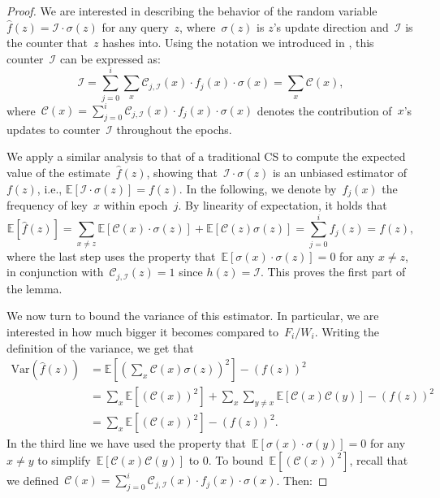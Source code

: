 \documentclass[sigconf]{acmart}
\newcommand{\parentheses}[1]{\left(#1\right)}
\newcommand{\expectation}[1]{\mathbb{E}\left[ #1 \right]}
\newcommand{\variance}[1]{\mathrm{Var}\left( #1 \right)}
\begin{document}
\begin{proof}
    We are interested in describing the behavior of the random
    variable~$\hat{f}(z) = \mathcal{I} \cdot \sigma(z)$ for any query~$z$,
    where~$\sigma(z)$ is $z$'s update direction and~$\mathcal{I}$ is the
    counter that~$z$ hashes into. Using the notation we introduced in
    , this counter~$\mathcal{I}$ can be expressed
    as:
    $$ \mathcal{I} = \sum_{j=0}^i \sum_x \mathcal{C}_{j,\mathcal{I}}(x) \cdot f_j(x) \cdot \sigma(x) = \sum_x \mathcal{C}(x), $$
    where~$\mathcal{C}(x) = \sum_{j=0}^i \mathcal{C}_{j,\mathcal{I}}(x) \cdot
    f_j(x) \cdot \sigma(x)$ denotes the contribution of~$x$'s updates to
    counter~$\mathcal{I}$ throughout the epochs.

    We apply a similar analysis to that of a traditional CS to compute the
    expected value of the estimate~$\hat{f}(z)$, showing that~$\mathcal{I}
    \cdot \sigma(z)$ is an unbiased estimator of~$f(z)$, i.e.,
    $\expectation{\mathcal{I} \cdot \sigma(z)} = f(z)$. In the following, we
    denote by~$f_j(x)$ the frequency of key~$x$ within epoch~$j$. By linearity
    of expectation, it holds that
    $$ \expectation{\hat{f}(z)} = \sum_{x \neq z} \expectation{\mathcal{C}(x) \cdot \sigma(z) } + \expectation{\mathcal{C}(z)\sigma(z)} = \sum_{j=0}^i f_j(z) = f(z),$$
    where the last step uses the property that~$\expectation{\sigma(x) \cdot
    \sigma(z) } = 0$ for any $x \neq z$, in conjunction
    with~$\mathcal{C}_{j,\mathcal{I}}(z)=1$ since $h(z)=\mathcal{I}$. This
    proves the first part of the lemma.

    We now turn to bound the variance of this estimator. In particular, we are
    interested in how much bigger it becomes compared to~$F_i/W_i$. Writing the
    definition of the variance, we get that
    \begin{align*}
        \variance{\hat{f}(z)} &= \expectation{\parentheses{\sum_x \mathcal{C}(x) \sigma(z)}^2} - (f(z))^2 \\
        & = \sum_x \expectation{\parentheses{\mathcal{C}(x)}^2} + \sum_x \sum_{y \neq x}\expectation{ \mathcal{C}(x) \mathcal{C}(y)} - (f(z))^2 \\
        & = \sum_x \expectation{\parentheses{\mathcal{C}(x)}^2} - (f(z))^2.
    \end{align*}
    In the third line we have used the property that~$\expectation{\sigma(x)
    \cdot \sigma(y)}=0$ for any $x\neq y$ to
    simplify~$\expectation{\mathcal{C}(x) \mathcal{C}(y)}$ to 0. To
    bound~$\expectation{\parentheses{\mathcal{C}(x)}^2}$, recall that we
    defined~$\mathcal{C}(x) = \sum_{j=0}^i \mathcal{C}_{j,\mathcal{I}}(x) \cdot
    f_j(x) \cdot \sigma(x)$. Then:


\end{proof}
\end{document}

